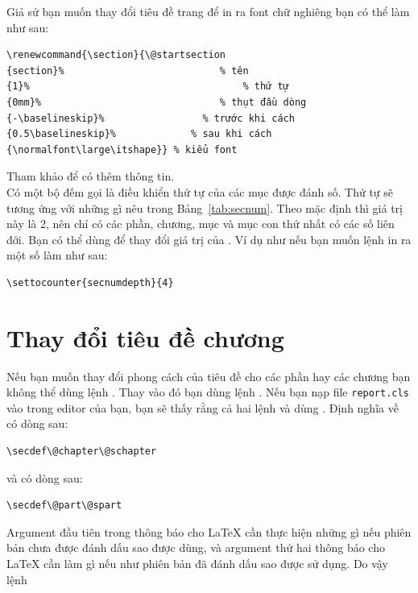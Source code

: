 \documentclass[a4paper]{report}
\begin{document}
\noindent Giả sử bạn muốn thay đổi tiêu đề trang để in ra font chữ nghiêng bạn có thể làm như sau:
\begin{verbatim}
\renewcommand{\section}{\@startsection
{section}%                           % tên
{1}%                                     % thứ tự
{0mm}%                               % thụt đầu dòng
{-\baselineskip}%                 % trước khi cách
{0.5\baselineskip}%             % sau khi cách
{\normalfont\large\itshape}} % kiểu font
\end{verbatim}
\noindent Tham khảo \latexguide{} để có thêm thông tin.\\[2.0ex]

\niondent Có một bộ đếm gọi là  điều khiển thứ tự của các mục được đánh số. Thứ tự sẽ tương ứng với những gì nêu trong Bảng~\ref{tab:secnum}. Theo mặc định thì giá trị này là 2, nên chỉ có các phần, chương, mục và mục con thứ nhất có các số liên đới.
Bạn có thể dùng  để thay đổi giá trị của .  
Ví dụ như nếu bạn muốn lệnh  in ra một số làm như sau:
\begin{verbatim}
\settocounter{secnumdepth}{4}
\end{verbatim}


\section{Thay đổi tiêu đề chương}

Nếu bạn muốn thay đổi phong cách của tiêu đề cho các phần hay các chương bạn không thể dùng lệnh . Thay vào đó bạn dùng lệnh . Nếu bạn nạp file \texttt{report.cls} vào trong editor của bạn, bạn sẽ thấy rằng cả hai lệnh  và  dùng . Định nghĩa về  có dòng sau:

\begin{verbatim}
\secdef\@chapter\@schapter
\end{verbatim}
và  có dòng sau:
\begin{verbatim}
\secdef\@part\@spart
\end{verbatim}
Argument đầu tiên trong  thông báo cho \LaTeX{} cần thực hiện những gì nếu phiên bản chưa được đánh dấu sao được dùng, và argument thứ hai thông báo cho \LaTeX{} cần làm gì nếu như phiên bản đã đánh dấu sao được sử dụng. Do vậy lệnh
\end{document}
